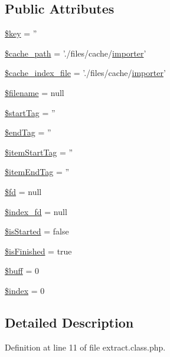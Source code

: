 \subsection*{Public Attributes}
\begin{DoxyCompactItemize}
\item 
\hyperlink{classextract_a894aac7e47b9ed0773922aa7eb9ce578}{\$key} = ''
\item 
\hyperlink{classextract_a00f1309c1e975d137a9f17ad9afc5d1e}{\$cache\+\_\+path} = './files/cache/\hyperlink{classimporter}{importer}'
\item 
\hyperlink{classextract_a6bd40f89eeb4e608723a39f5824d0c1e}{\$cache\+\_\+index\+\_\+file} = './files/cache/\hyperlink{classimporter}{importer}'
\item 
\hyperlink{classextract_abec232df6889e57dd327ddf132799f4c}{\$filename} = null
\item 
\hyperlink{classextract_a3acbe3af3d1b083b33023202a5e05432}{\$start\+Tag} = ''
\item 
\hyperlink{classextract_a46190b1f23addca9726e18aa15929c2a}{\$end\+Tag} = ''
\item 
\hyperlink{classextract_a11629128aedd1fc4b0a889640c693d0a}{\$item\+Start\+Tag} = ''
\item 
\hyperlink{classextract_abddb079afc9c7c2f210e7793b93388e5}{\$item\+End\+Tag} = ''
\item 
\hyperlink{classextract_ae21a224916b245a23dd69139f58c81ed}{\$fd} = null
\item 
\hyperlink{classextract_a6805ee81f498cae226d90b8fa9ecba88}{\$index\+\_\+fd} = null
\item 
\hyperlink{classextract_a609fc88642ae3bf1e27f0232f1b21171}{\$is\+Started} = false
\item 
\hyperlink{classextract_a0962c888279f7c5d551d3fdf1af1ee4c}{\$is\+Finished} = true
\item 
\hyperlink{classextract_a6f9b9ca9e370fe234587851838a368e7}{\$buff} = 0
\item 
\hyperlink{classextract_a167ca671b16d1b95eef76886f6d91a0c}{\$index} = 0
\end{DoxyCompactItemize}


\subsection{Detailed Description}


Definition at line 11 of file extract.\+class.\+php.



